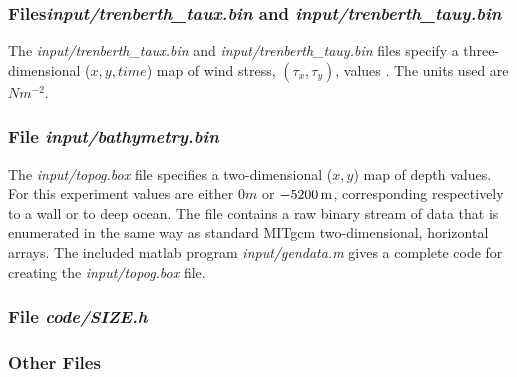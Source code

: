 \subsubsection{Files{\it input/trenberth\_taux.bin} and {\it
  input/trenberth\_tauy.bin}}

The {\it input/trenberth\_taux.bin} and {\it
  input/trenberth\_tauy.bin} files specify a three-dimensional
($x,y,time$) map of wind stress, $(\tau_{x},\tau_{y})$, values
\citep{trenberth90}. The units used are $Nm^{-2}$.

\subsubsection{File {\it input/bathymetry.bin}}


The {\it input/topog.box} file specifies a two-dimensional ($x,y$) 
map of depth values. For this experiment values are either
$0m$ or $-5200\,{\rm m}$, corresponding respectively to a wall or to deep
ocean. The file contains a raw binary stream of data that is enumerated
in the same way as standard MITgcm two-dimensional, horizontal arrays.
The included matlab program {\it input/gendata.m} gives a complete
code for creating the {\it input/topog.box} file.

\subsubsection{File {\it code/SIZE.h}}








\subsubsection{Other Files }

